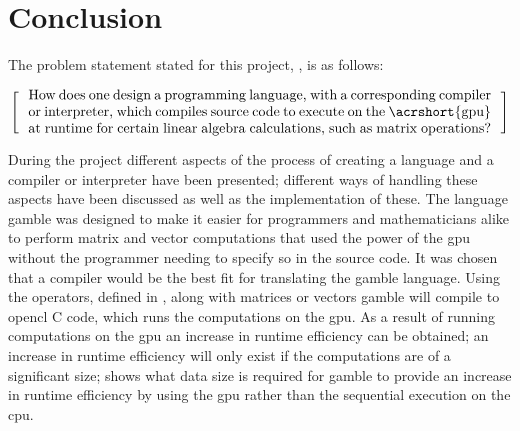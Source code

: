 \chapter{Conclusion} %
\label{cha:conclusion}
The problem statement stated for this project, , is as follows:

\[
  \left[
  \begin{minipage}{\textwidth}
  \centering
  \begin{minipage}{0.96\textwidth}
  How does one design a programming language, with a corresponding compiler or interpreter, which compiles source code to execute on the \acrshort{gpu} at runtime for certain linear algebra calculations, such as matrix operations?
  \end{minipage}
  \end{minipage}
    \right]
\]

During the project different aspects of the process of creating a language and a compiler or interpreter have been presented; different ways of handling these aspects have been discussed as well as the implementation of these.
The language \gls{gamble} was designed to make it easier for programmers and mathematicians alike to perform matrix and vector computations that used the power of the \acrshort{gpu} without the programmer needing to specify so in the source code.
It was chosen that a compiler would be the best fit for translating the \gls{gamble} language.
Using the operators, defined in , along with matrices or vectors \gls{gamble} will compile to \gls{opencl} C code, which runs the computations on the \acrshort{gpu}.
As a result of running computations on the \acrshort{gpu} an increase in runtime efficiency can be obtained; an increase in runtime efficiency will only exist if the computations are of a significant size;  shows what data size is required for \gls{gamble} to provide an increase in runtime efficiency by using the \acrshort{gpu} rather than the sequential execution on the \acrshort{cpu}.

